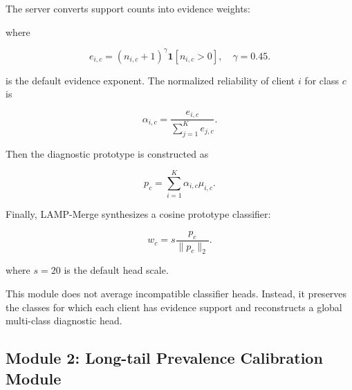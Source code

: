 \documentclass[letterpaper]{article}
\begin{document}
The server converts support counts into evidence weights:


where

\begin{equation}
e_{i,c}=(n_{i,c}+1)^\gamma \mathbf{1}[n_{i,c}>0],
\quad \gamma=0.45.
\end{equation}

is the default evidence exponent. The normalized reliability of client $i$ for class $c$ is


\begin{equation}
\alpha_{i,c}=\frac{e_{i,c}}{\sum_{j=1}^{K}e_{j,c}}.
\end{equation}

Then the diagnostic prototype is constructed as


\begin{equation}
p_c=\sum_{i=1}^{K}\alpha_{i,c}\mu_{i,c}.
\end{equation}

Finally, LAMP-Merge synthesizes a cosine prototype classifier:


\begin{equation}
w_c=s\frac{p_c}{\|p_c\|_2}.
\end{equation}

where $s=20$ is the default head scale.


This module does not average incompatible classifier heads. Instead, it preserves the classes for which each client has evidence support and reconstructs a global multi-class diagnostic head.


\subsection{Module 2: Long-tail Prevalence Calibration Module}
\end{document}
